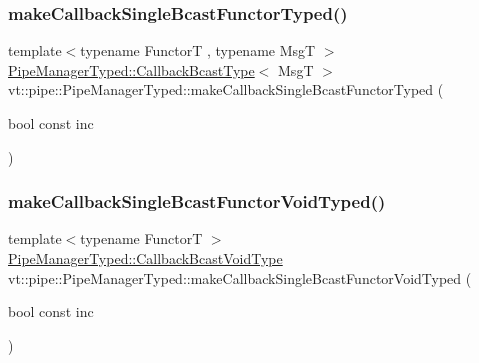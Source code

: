 \mbox{\label{structvt_1_1pipe_1_1_pipe_manager_typed_a74135c6c11f5cd49bf560be506056a03}} 
\subsubsection{\texorpdfstring{make\+Callback\+Single\+Bcast\+Functor\+Typed()}{makeCallbackSingleBcastFunctorTyped()}}
{\footnotesize\ttfamily template$<$typename FunctorT , typename MsgT $>$ \\
\hyperlink{structvt_1_1pipe_1_1_pipe_manager_typed_a4176395e8a35ec2a809890a9aad5b29e}{Pipe\+Manager\+Typed\+::\+Callback\+Bcast\+Type}$<$ MsgT $>$ vt\+::pipe\+::\+Pipe\+Manager\+Typed\+::make\+Callback\+Single\+Bcast\+Functor\+Typed (\begin{DoxyParamCaption}\item[{bool const}]{inc }\end{DoxyParamCaption})}

\mbox{\label{structvt_1_1pipe_1_1_pipe_manager_typed_a9392cfaa2787f28fd1193421eff4e837}} 
\subsubsection{\texorpdfstring{make\+Callback\+Single\+Bcast\+Functor\+Void\+Typed()}{makeCallbackSingleBcastFunctorVoidTyped()}}
{\footnotesize\ttfamily template$<$typename FunctorT $>$ \\
\hyperlink{structvt_1_1pipe_1_1_pipe_manager_typed_ab028a342e37daeacc38acbfc185e0997}{Pipe\+Manager\+Typed\+::\+Callback\+Bcast\+Void\+Type} vt\+::pipe\+::\+Pipe\+Manager\+Typed\+::make\+Callback\+Single\+Bcast\+Functor\+Void\+Typed (\begin{DoxyParamCaption}\item[{bool const}]{inc }\end{DoxyParamCaption})}

